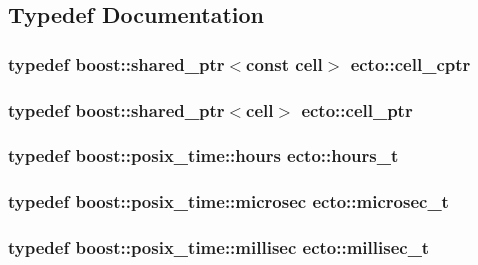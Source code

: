 \subsection{\-Typedef \-Documentation}
\hypertarget{namespaceecto_ab708c826226c91fd6f3c8c121f293a78}{
\subsubsection[{cell\-\_\-cptr}]{\setlength{\rightskip}{0pt plus 5cm}typedef boost\-::shared\-\_\-ptr$<$const {\bf cell}$>$ {\bf ecto\-::cell\-\_\-cptr}}}\label{namespaceecto_ab708c826226c91fd6f3c8c121f293a78}
\hypertarget{namespaceecto_aed1809e82b9229ea81ef9ee3438cf62c}{
\subsubsection[{cell\-\_\-ptr}]{\setlength{\rightskip}{0pt plus 5cm}typedef boost\-::shared\-\_\-ptr$<${\bf cell}$>$ {\bf ecto\-::cell\-\_\-ptr}}}\label{namespaceecto_aed1809e82b9229ea81ef9ee3438cf62c}
\hypertarget{namespaceecto_a477c167c1e1288b689db5872f650540e}{
\subsubsection[{hours\-\_\-t}]{\setlength{\rightskip}{0pt plus 5cm}typedef boost\-::posix\-\_\-time\-::hours {\bf ecto\-::hours\-\_\-t}}}\label{namespaceecto_a477c167c1e1288b689db5872f650540e}
\hypertarget{namespaceecto_affe36dc8be6d20a6b8f7359655c8dc23}{
\subsubsection[{microsec\-\_\-t}]{\setlength{\rightskip}{0pt plus 5cm}typedef boost\-::posix\-\_\-time\-::microsec {\bf ecto\-::microsec\-\_\-t}}}\label{namespaceecto_affe36dc8be6d20a6b8f7359655c8dc23}
\hypertarget{namespaceecto_ab1f4721cc3b311f9615b3092d291260b}{
\subsubsection[{millisec\-\_\-t}]{\setlength{\rightskip}{0pt plus 5cm}typedef boost\-::posix\-\_\-time\-::millisec {\bf ecto\-::millisec\-\_\-t}}}\label{namespaceecto_ab1f4721cc3b311f9615b3092d291260b}
